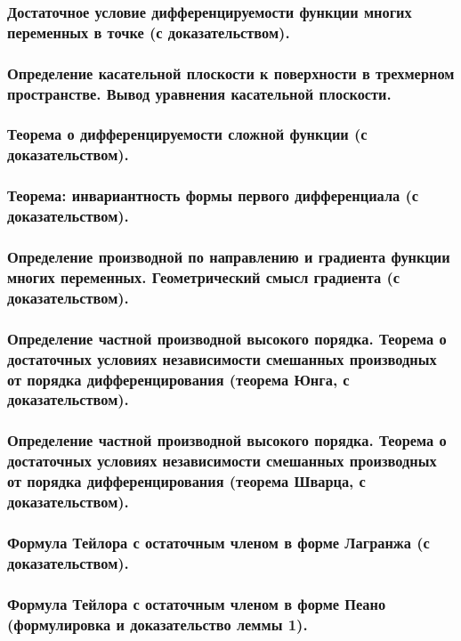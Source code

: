 \documentclass[10pt]{article}
\begin{document}
    \subsubsection{Достаточное условие дифференцируемости функции многих переменных в точке (с доказательством).}
    \subsubsection{Определение касательной плоскости к поверхности в трехмерном пространстве. Вывод уравнения касательной плоскости.}
    \subsubsection{Теорема о дифференцируемости сложной функции (с доказательством).}
    \subsubsection{Теорема: инвариантность формы первого дифференциала (с доказательством).}
    \subsubsection{Определение производной по направлению и градиента функции многих переменных. Геометрический смысл градиента (с доказательством).}
    \subsubsection{Определение частной производной высокого порядка. Теорема о достаточных условиях независимости смешанных производных от порядка дифференцирования (теорема Юнга, с доказательством).}
    \subsubsection{Определение частной производной высокого порядка. Теорема о достаточных условиях независимости смешанных производных от порядка дифференцирования (теорема Шварца, с доказательством).}
    \subsubsection{Формула Тейлора с остаточным членом в форме Лагранжа (с доказательством).}
    \subsubsection{Формула Тейлора с остаточным членом в форме Пеано (формулировка и доказательство леммы 1).}
\end{document}
